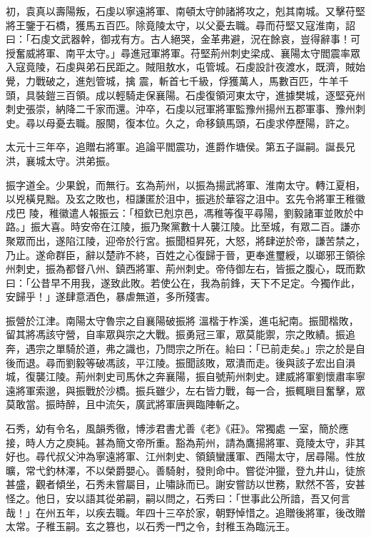 \begin{pinyinscope}
 初，袁真以壽陽叛，石虔以寧遠將軍、南頓太守帥諸將攻之，剋其南城。又擊苻堅將王鑒于石橋，獲馬五百匹。除竟陵太守，以父憂去職。尋而苻堅又寇淮南，詔曰：「石虔文武器幹，御戎有方。古人絕哭，金革弗避，況在餘哀，豈得辭事！可授奮威將軍、南平太守。」尋進冠軍將軍。苻堅荊州刺史梁成、襄陽太守閻震率眾入寇竟陵，石虔與弟石民距之。賊阻敖水，屯管城。石虔設計夜渡水，既濟，賊始覺，力戰破之，進剋管城，擒
 震，斬首七千級，俘獲萬人，馬數百匹，牛羊千頭，具裝鎧三百領。成以輕騎走保襄陽。石虔復領河東太守，進據樊城，逐堅兗州刺史張崇，納降二千家而還。沖卒，石虔以冠軍將軍監豫州揚州五郡軍事、豫州刺史。尋以母憂去職。服闋，復本位。久之，命移鎮馬頭，石虔求停歷陽，許之。



 太元十三年卒，追贈右將軍。追論平閻震功，進爵作塘侯。第五子誕嗣。誕長兄洪，襄城太守。洪弟振。



 振字道全。少果銳，而無行。玄為荊州，以振為揚武將軍、淮南太守。轉江夏相，以兇橫見黜。及玄之敗也，桓謙匿於沮中，振逃於華容之沮中。玄先令將軍王稚徽戍巴
 陵，稚徽遣人報振云：「桓欽已剋京邑，馮稚等復平尋陽，劉毅諸軍並敗於中路。」振大喜。時安帝在江陵，振乃聚黨數十人襲江陵。比至城，有眾二百。謙亦聚眾而出，遂陷江陵，迎帝於行宮。振聞桓昇死，大怒，將肆逆於帝，謙苦禁之，乃止。遂命群臣，辭以楚祚不終，百姓之心復歸于晉，更奉進璽綬，以瑯邪王領徐州刺史，振為都督八州、鎮西將軍、荊州刺史。帝侍御左右，皆振之腹心，既而歎曰：「公昔早不用我，遂致此敗。若使公在，我為前鋒，天下不足定。今獨作此，安歸乎！」遂肆意酒色，暴虐無道，多所殘害。



 振營於江津。南陽太守魯宗之自襄陽破振將
 溫楷于柞溪，進屯紀南。振聞楷敗，留其將馮該守營，自率眾與宗之大戰。振勇冠三軍，眾莫能禦，宗之敗績。振追奔，遇宗之單騎於道，弗之識也，乃問宗之所在。紿曰：「已前走矣。」宗之於是自後而退。尋而劉毅等破馮該，平江陵。振聞該敗，眾潰而走。後與該子宏出自溳城，復襲江陵。荊州刺史司馬休之奔襄陽，振自號荊州刺史。建威將軍劉懷肅率寧遠將軍索邈，與振戰於沙橋。振兵雖少，左右皆力戰，每一合，振輒瞋目奮擊，眾莫敢當。振時醉，且中流矢，廣武將軍唐興臨陣斬之。



 石秀，幼有令名，風韻秀徹，博涉君書尤善《老》《莊》。常獨處
 一室，簡於應接，時人方之庾純。甚為簡文帝所重。豁為荊州，請為鷹揚將軍、竟陵太守，非其好也。尋代叔父沖為寧遠將軍、江州刺史、領鎮蠻護軍、西陽太守，居尋陽。性放曠，常弋釣林澤，不以榮爵嬰心。善騎射，發則命中。嘗從沖獵，登九井山，徒旅甚盛，觀者傾坐，石秀未嘗屬目，止嘯詠而已。謝安嘗訪以世務，默然不答，安甚怪之。他日，安以語其從弟嗣，嗣以問之，石秀曰：「世事此公所諳，吾又何言哉！」在州五年，以疾去職。年四十三卒於家，朝野悼惜之。追贈後將軍，後改贈太常。子稚玉嗣。玄之篡也，以石秀一門之令，封稚玉為臨沅王。




\end{pinyinscope}
